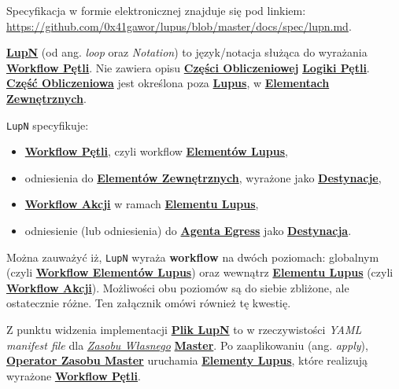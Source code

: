 \label{appendix:3}\hypertarget{appendix:3}{}

Specyfikacja w formie elektronicznej znajduje się pod linkiem: \url{https://github.com/0x41gawor/lupus/blob/master/docs/spec/lupn.md}.


\hyperlink{def:lupn}{\textbf{LupN}} (od ang. \textit{loop} oraz \textit{Notation}) to język/notacja służąca do wyrażania \hyperlink{def:workflow-petli}{\textbf{Workflow Pętli}}. Nie zawiera opisu \hyperlink{def:czesc-obliczeniowa}{\textbf{Części Obliczeniowej}} \hyperlink{def:logika-petli}{\textbf{Logiki Pętli}}. \hyperlink{def:czesc-obliczeniowa}{\textbf{Część Obliczeniowa}} jest określona poza \hyperlink{def:lupus}{\textbf{Lupus}}, w \hyperlink{def:element-zewnetrzny}{\textbf{Elementach Zewnętrznych}}.

\texttt{LupN} specyfikuje:
\begin{itemize}
    \item \hyperlink{def:workflow-petli}{\textbf{Workflow Pętli}}, czyli workflow \hyperlink{def:element-lupus}{\textbf{Elementów Lupus}},
    \item odniesienia do \hyperlink{def:element-zewnetrzny}{\textbf{Elementów Zewnętrznych}}, wyrażone jako \hyperlink{def:destynacja}{\textbf{Destynacje}},
    \item \hyperlink{def:workflow-petli}{\textbf{Workflow Akcji}} w ramach \hyperlink{def:element-lupus}{\textbf{Elementu Lupus}},
    \item odniesienie (lub odniesienia) do \hyperlink{def:agent-egress}{\textbf{Agenta Egress}} jako \hyperlink{def:destynacja}{\textbf{Destynacja}}.
\end{itemize}

Można zauważyć iż, \texttt{LupN} wyraża \textbf{workflow} na dwóch poziomach: globalnym (czyli \hyperlink{def:workflow-petli}{\textbf{Workflow Elementów Lupus}}) oraz wewnątrz \hyperlink{def:element-lupus}{\textbf{Elementu Lupus}} (czyli \hyperlink{def:workflow-petli}{\textbf{Workflow Akcji}}). Możliwości obu poziomów są do siebie zbliżone, ale ostatecznie różne. Ten załącznik omówi również tę kwestię.


Z punktu widzenia implementacji \hyperlink{def:plik-lupn}{\textbf{Plik LupN}} to w rzeczywistości \textit{YAML manifest file} dla \hyperlink{def:zasoby-wlasne}{\textit{Zasobu Własnego}} \hyperlink{def:master}{\textbf{Master}}. Po zaaplikowaniu (ang. \textit{apply}), \hyperlink{def:operator-zasobu-master}{\textbf{Operator Zasobu Master}} uruchamia \hyperlink{def:element-lupus}{\textbf{Elementy Lupus}}, które realizują wyrażone \hyperlink{def:workflow-petli}{\textbf{Workflow Pętli}}.

